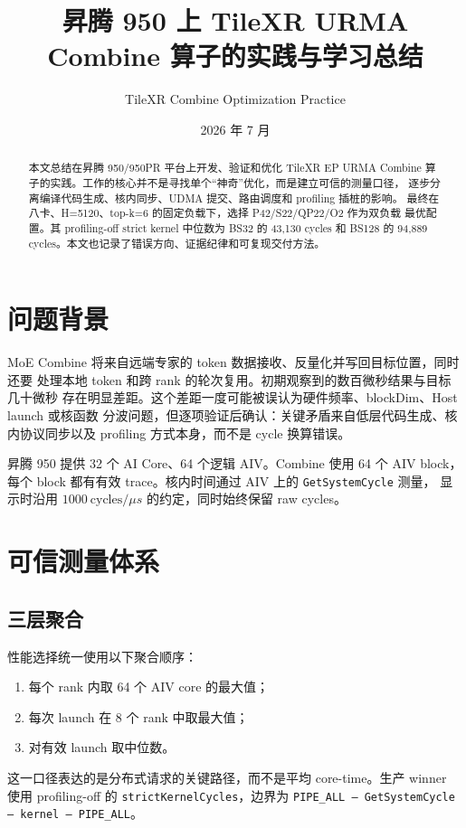 \documentclass[UTF8,a4paper,11pt]{ctexart}
\title{昇腾 950 上 TileXR URMA Combine 算子的实践与学习总结}
\author{TileXR Combine Optimization Practice}
\date{2026 年 7 月}
\begin{document}
\maketitle

\begin{abstract}
本文总结在昇腾 950/950PR 平台上开发、验证和优化 TileXR EP URMA Combine
算子的实践。工作的核心并不是寻找单个“神奇”优化，而是建立可信的测量口径，
逐步分离编译代码生成、核内同步、UDMA 提交、路由调度和 profiling 插桩的影响。
最终在八卡、H=5120、top-k=6 的固定负载下，选择 P42/S22/QP22/O2 作为双负载
最优配置。其 profiling-off strict kernel 中位数为 BS32 的 43,130 cycles 和
BS128 的 94,889 cycles。本文也记录了错误方向、证据纪律和可复现交付方法。
\end{abstract}

\section{问题背景}

MoE Combine 将来自远端专家的 token 数据接收、反量化并写回目标位置，同时还要
处理本地 token 和跨 rank 的轮次复用。初期观察到的数百微秒结果与目标几十微秒
存在明显差距。这个差距一度可能被误认为硬件频率、blockDim、Host launch 或核函数
分波问题，但逐项验证后确认：关键矛盾来自低层代码生成、核内协议同步以及 profiling
方式本身，而不是 cycle 换算错误。

昇腾 950 提供 32 个 AI Core、64 个逻辑 AIV。Combine 使用 64 个 AIV block，
每个 block 都有有效 trace。核内时间通过 AIV 上的 \texttt{GetSystemCycle} 测量，
显示时沿用 $1000\ \mathrm{cycles}/\mu s$ 的约定，同时始终保留 raw cycles。

\section{可信测量体系}

\subsection{三层聚合}

性能选择统一使用以下聚合顺序：
\begin{enumerate}
  \item 每个 rank 内取 64 个 AIV core 的最大值；
  \item 每次 launch 在 8 个 rank 中取最大值；
  \item 对有效 launch 取中位数。
\end{enumerate}

这一口径表达的是分布式请求的关键路径，而不是平均 core-time。生产 winner 使用
profiling-off 的 \texttt{strictKernelCycles}，边界为
\texttt{PIPE\_ALL -- GetSystemCycle -- kernel -- PIPE\_ALL}。
\end{document}
